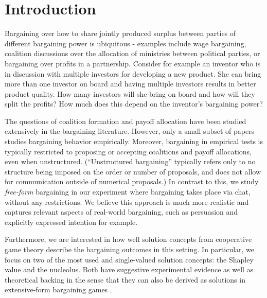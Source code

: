\section{Introduction} \label{sec:intro}


Bargaining over how to share jointly produced surplus between parties of different bargaining power is ubiquitous - examples include wage bargaining, coalition discussions over the allocation of ministries between political parties, or bargaining over profits in a partnership. 
Consider for example an inventor who is in discussion with multiple investors for developing a new product. She can bring more than one investor on board and having multiple investors results in better product quality. How many investors will she bring on board and how will they split the profits? How much does this depend on the inventor's bargaining power?

The questions of coalition formation and payoff allocation have been studied extensively in the bargaining literature. However, only a small subset of papers studies bargaining behavior empirically. Moreover, bargaining in empirical tests is typically restricted to proposing or accepting coalitions and payoff allocations, even when unstructured. (``Unstructured bargaining'' typically refers only to no structure being imposed on the order or number of proposals, and does not allow for communication outside of numerical proposals.) In contrast to this, we study \emph{free-form} bargaining in our experiment where bargaining takes place via chat, without any restrictions. We believe this approach is much more realistic and captures relevant aspects of real-world bargaining, such as persuasion and explicitly expressed intention for example.

Furthermore, we are interested in how well solution concepts from cooperative game theory describe the bargaining outcomes in this setting. In particular, we focus on two of the most used and single-valued solution concepts: the Shapley value and the nucleolus. Both have suggestive experimental evidence \parencite{MurnighanRoth1977, MichenerPotter1981, ClippelRozen2022, KomoritaHamiltonKravitz1984, LeopoldWildburger1992} as well as theoretical backing in the sense that they can also be derived as solutions in extensive-form bargaining games \parencite{gul1989bargaining,hart1996bargaining,stole1996organizational}.


